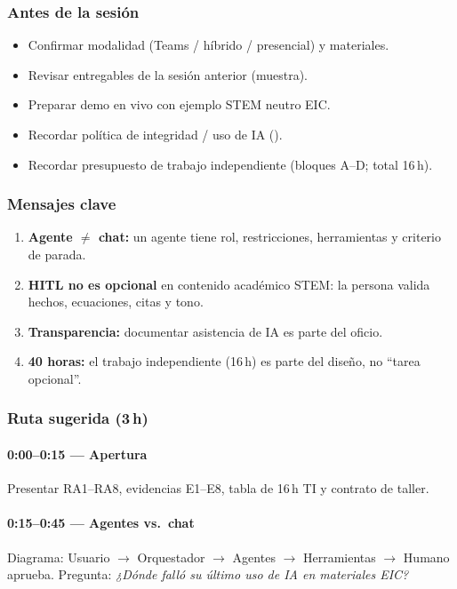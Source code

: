 \subsubsection*{Antes de la sesión}
\begin{itemize}
\item[$\square$] Confirmar modalidad (Teams / híbrido / presencial) y materiales.
\item[$\square$] Revisar entregables de la sesión anterior (muestra).
\item[$\square$] Preparar demo en vivo con ejemplo STEM neutro EIC.
\item[$\square$] Recordar política de integridad / uso de IA (\ceddie).
\item[$\square$] Recordar presupuesto de trabajo independiente (bloques A--D; total 16\,h).
\end{itemize}

\subsubsection*{Mensajes clave}
\begin{enumerate}
\item \textbf{Agente $\neq$ chat:} un agente tiene rol, restricciones, herramientas y criterio de parada.
\item \textbf{HITL no es opcional} en contenido académico STEM: la persona valida hechos, ecuaciones, citas y tono.
\item \textbf{Transparencia:} documentar asistencia de IA es parte del oficio.
\item \textbf{40 horas:} el trabajo independiente (16\,h) es parte del diseño, no ``tarea opcional''.
\end{enumerate}

\subsubsection*{Ruta sugerida (3\,h)}
\paragraph{0:00--0:15 --- Apertura} Presentar RA1--RA8, evidencias E1--E8, tabla de 16\,h TI y contrato de taller.
\paragraph{0:15--0:45 --- Agentes vs.\ chat} Diagrama: Usuario $\rightarrow$ Orquestador $\rightarrow$ Agentes $\rightarrow$ Herramientas $\rightarrow$ Humano aprueba. Pregunta: \emph{¿Dónde falló su último uso de IA en materiales EIC?}

